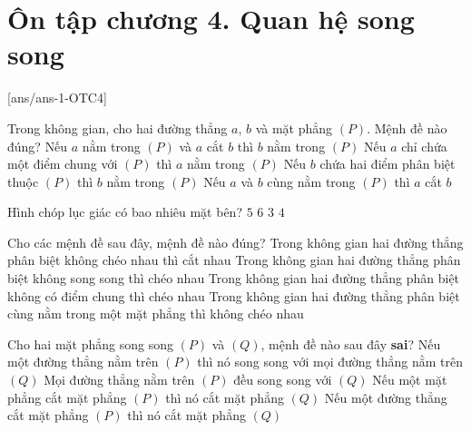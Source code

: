 \section{Ôn tập chương 4. Quan hệ song song}
[ans/ans-1-OTC4]
\caulc
\begin{ex}%
	Trong không gian, cho hai đường thẳng $a$, $b$ và mặt phẳng $\left( P \right)$. Mệnh đề nào đúng?
	\choice
	{Nếu $a$ nằm trong $\left( P \right)$ và $a$ cắt $b$ thì $b$ nằm trong $\left( P \right)$}
	{Nếu $a$ chỉ chứa một điểm chung với $\left( P \right)$ thì $a$ nằm trong $\left( P \right)$}
	{\True Nếu $b$ chứa hai điểm phân biệt thuộc $\left( P \right)$ thì $b$ nằm trong $\left( P \right)$}
	{Nếu $a$ và $b$ cùng nằm trong $\left( P \right)$ thì $a$ cắt $b$}	
	\loigiai{}	
\end{ex}
\begin{ex}%
	Hình chóp lục giác có bao nhiêu mặt bên?
	\choice
	{$5$}
	{\True $6$}
	{$3$}
	{$4$}	
\end{ex}

\begin{ex}%
	Cho các mệnh đề sau đây, mệnh đề nào đúng?
	\choice
	{Trong không gian hai đường thẳng phân biệt không chéo nhau thì cắt nhau}
	{Trong không gian hai đường thẳng phân biệt không song song thì chéo nhau}
	{Trong không gian hai đường thẳng phân biệt không có điểm chung thì chéo nhau}
	{\True Trong không gian hai đường thẳng phân biệt cùng nằm trong một mặt phẳng thì không chéo nhau}	
\end{ex}

\begin{ex}%
	Cho hai mặt phẳng song song $\left( P \right)$ và $\left( Q \right)$, mệnh đề nào sau đây \textbf{sai}?
	\choice
	{\True Nếu một đường thẳng nằm trên $\left( P \right)$ thì nó song song với mọi đường thẳng nằm trên $\left( Q \right)$}
	{Mọi đường thẳng nằm trên $\left( P \right)$ đều song song với $\left( Q \right)$}
	{Nếu một mặt phẳng cắt mặt phẳng $\left( P \right)$ thì nó cắt mặt phẳng $\left( Q \right)$}
	{Nếu một đường thẳng cắt mặt phẳng $\left( P \right)$ thì nó cắt mặt phẳng $\left( Q \right)$}	
\end{ex}

